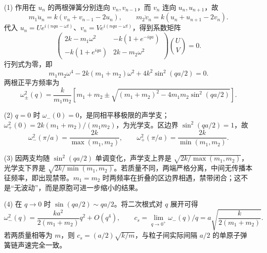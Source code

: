 (1) 作用在 \(u_n\) 的两根弹簧分别连向 \(v_n,v_{n-1}\)，而 \(v_n\) 连向 \(u_n,u_{n+1}\)，故
\[
m_1\ddot u_n=k(v_n+v_{n-1}-2u_n),\qquad
m_2\ddot v_n=k(u_n+u_{n+1}-2v_n).
\]
代入 \(u_n=Ue^{i(nqa-\omega t)}\)、\(v_n=Ve^{i(nqa-\omega t)}\)，得到系数矩阵
\[
\begin{pmatrix}2k-m_1\omega^2&-k(1+e^{-iqa})\\-k(1+e^{iqa})&2k-m_2\omega^2\end{pmatrix}\binom UV=0.
\]
行列式为零，即
\[
m_1m_2\omega^4-2k(m_1+m_2)\omega^2+4k^2\sin^2(qa/2)=0.
\]
两根正平方频率为
\[
\omega_\pm^2(q)=\frac{k}{m_1m_2}\left[m_1+m_2\pm\sqrt{(m_1+m_2)^2-4m_1m_2\sin^2(qa/2)}\right].
\]

(2) \(q=0\) 时 \(\omega_-(0)=0\)，是同相平移极限的声学支；\(\omega_+^2(0)=2k(m_1+m_2)/(m_1m_2)\)，为光学支。区边界 \(\sin^2(qa/2)=1\)，故
\[
\omega_-^2(\pi/a)=\frac{2k}{\max(m_1,m_2)},\qquad
\omega_+^2(\pi/a)=\frac{2k}{\min(m_1,m_2)}.
\]

(3) 因两支均随 \(\sin^2(qa/2)\) 单调变化，声学支上界是 \(\sqrt{2k/\max(m_1,m_2)}\)，光学支下界是 \(\sqrt{2k/\min(m_1,m_2)}\)。若质量不同，两端严格分离，中间无传播本征频率，即出现禁带。\(m_1=m_2\) 时两频率在折叠的区边界相遇，禁带闭合；这不是“无波动”，而是原胞可进一步缩小的结果。

(4) 在 \(q\to0\) 时 \(\sin(qa/2)\sim qa/2\)。将二次根式对 \(q\) 展开可得
\[
\omega_-^2(q)=\frac{k a^2}{2(m_1+m_2)}q^2+O(q^4),\qquad
c_s=\lim_{q\to0^+}\omega_-(q)/q=a\sqrt{\frac{k}{2(m_1+m_2)}}.
\]
若两质量相等为 \(m\)，则 \(c_s=(a/2)\sqrt{k/m}\)，与粒子间实际间隔 \(a/2\) 的单原子弹簧链声速完全一致。
